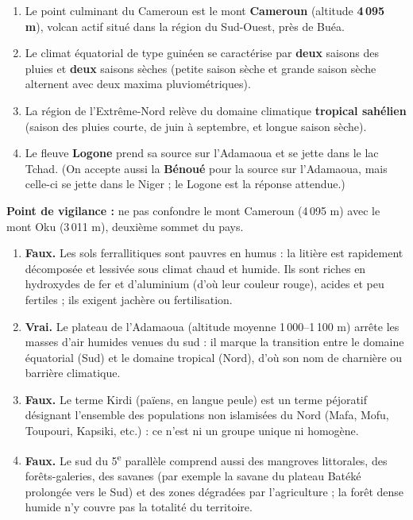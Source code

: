 \documentclass[11pt]{article}
\begin{document}
\begin{corrige}
\begin{enumerate}
\item Le point culminant du Cameroun est le mont \textbf{Cameroun} (altitude \textbf{4\,095 m}), volcan actif situé dans la région du Sud-Ouest, près de Buéa.
\item Le climat équatorial de type guinéen se caractérise par \textbf{deux} saisons des pluies et \textbf{deux} saisons sèches (petite saison sèche et grande saison sèche alternent avec deux maxima pluviométriques).
\item La région de l'Extrême-Nord relève du domaine climatique \textbf{tropical sahélien} (saison des pluies courte, de juin à septembre, et longue saison sèche).
\item Le fleuve \textbf{Logone} prend sa source sur l'Adamaoua et se jette dans le lac Tchad. (On accepte aussi la \textbf{Bénoué} pour la source sur l'Adamaoua, mais celle-ci se jette dans le Niger ; le Logone est la réponse attendue.)
\end{enumerate}
\textbf{Point de vigilance :} ne pas confondre le mont Cameroun (4\,095 m) avec le mont Oku (3\,011 m), deuxième sommet du pays.
\end{corrige}

\begin{corrige}
\begin{enumerate}
\item \textbf{Faux.} Les sols ferrallitiques sont pauvres en humus : la litière est rapidement décomposée et lessivée sous climat chaud et humide. Ils sont riches en hydroxydes de fer et d'aluminium (d'où leur couleur rouge), acides et peu fertiles ; ils exigent jachère ou fertilisation.
\item \textbf{Vrai.} Le plateau de l'Adamaoua (altitude moyenne 1\,000--1\,100 m) arrête les masses d'air humides venues du sud : il marque la transition entre le domaine équatorial (Sud) et le domaine tropical (Nord), d'où son nom de \og charnière \fg ou \og barrière \fg climatique.
\item \textbf{Faux.} Le terme \og Kirdi \fg (païens, en langue peule) est un terme péjoratif désignant l'ensemble des populations non islamisées du Nord (Mafa, Mofu, Toupouri, Kapsiki, etc.) : ce n'est ni un groupe unique ni homogène.
\item \textbf{Faux.} Le sud du 5\textsuperscript{e} parallèle comprend aussi des mangroves littorales, des forêts-galeries, des savanes (par exemple la savane du plateau Batéké prolongée vers le Sud) et des zones dégradées par l'agriculture ; la forêt dense humide n'y couvre pas la totalité du territoire.
\end{enumerate}
\end{corrige}
\end{document}
